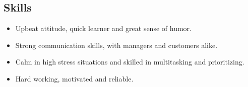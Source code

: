 \documentclass[oneside, final]{scrartcl}
\begin{document}
\begin{center}
\begin{comment}
\section{Education}
Guilderland High School\hfill 2004 - 2008\\
High School Diploma\hfill Albany, NY\\
\end{comment}

\section{Skills}
\begin{itemize}
	\setlength{\itemsep}{1pt}
	\setlength{\parskip}{0pt}
	\setlength{\parsep}{0pt}
	\setlength{\leftmargin}{-5mm}
    \item Upbeat attitude, quick learner and great sense of humor.
    \item Strong communication skills, with managers and customers alike.
    \item Calm in high stress situations and skilled in multitasking and prioritizing.
    \item Hard working, motivated and reliable.
\end{itemize}

\end{center}
\end{document}
